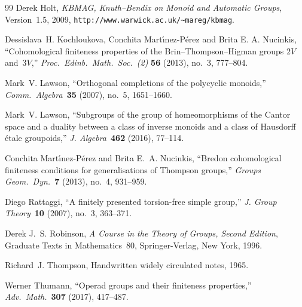\documentclass[a4paper,11pt]{article}
\numberwithin{equation}{section}
\newcommand{\nbd}{\nobreakdash-}
\begin{document}
\begin{thebibliography}{99}
  Derek Holt, \emph{KBMAG, Knuth--Bendix on Monoid and Automatic
    Groups}, Version~1.5, 2009,
  \verb+http://www.warwick.ac.uk/~mareg/kbmag+.

  Dessislava~H. Kochloukova, Conchita Mart\'{\i}nez-P\'{e}rez and
  Brita E. A. Nucinkis, ``Cohomological finiteness properties of the
  Brin--Thompson--Higman groups $2V$ and~$3V$,''
  \textit{Proc.\ Edinb.\ Math.\ Soc.~(2)} \textbf{56} (2013), no.~3,
  777--804.

  Mark~V. Lawson, ``Orthogonal completions of the polycyclic
  monoids,'' \textit{Comm.\ Algebra}~\textbf{35} (2007), no.~5,
  1651--1660.

  Mark~V. Lawson, ``Subgroups of the group of homeomorphisms of the
  Cantor space and a duality between a class of inverse monoids and a
  class of Hausdorff \'{e}tale groupoids,''
  \textit{J. Algebra}~\textbf{462} (2016), 77--114.

  Conchita Mart\'{\i}nez-P\'{e}rez and Brita E.~A. Nucinkis, ``Bredon
  cohomological finiteness conditions for generalisations of Thompson
  groups,'' \textit{Groups Geom.\ Dyn.}~\textbf{7} (2013), no.~4,
  931--959.


  Diego Rattaggi, ``A finitely presented torsion-free simple group,''
  \textit{J. Group Theory}~\textbf{10} (2007), no.~3, 363--371.

  Derek J.~S. Robinson, \textit{A Course in the Theory of Groups,
    Second Edition}, Graduate Texts in Mathematics~80,
  Springer-Verlag, New York, 1996.



  Richard~J. Thompson, Handwritten widely circulated notes, 1965.

  Werner Thumann, ``Operad groups and their finiteness properties,''
  \textit{Adv.\ Math.}~\textbf{307} (2017), 417--487.


\end{thebibliography}
\end{document}
